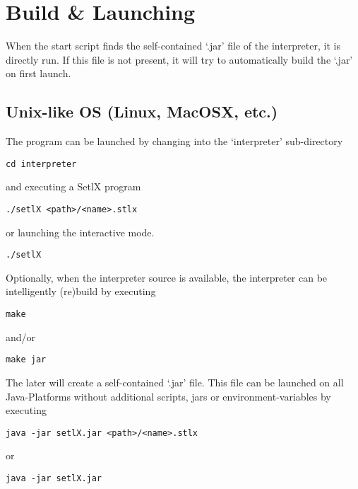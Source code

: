 \section{Build \& Launching}

When the start script finds the self-contained `.jar' file of the interpreter, it is directly run. If this file is not present, it will try to automatically build the `.jar' on first launch.

\subsection{Unix-like OS (Linux, MacOSX, etc.)}

The \setlX{} program can be launched by changing into the `interpreter' sub-directory

\begin{lstlisting}
cd interpreter
\end{lstlisting}

and executing a SetlX program

\begin{lstlisting}
./setlX <path>/<name>.stlx
\end{lstlisting}

or launching the interactive mode.

\begin{lstlisting}
./setlX
\end{lstlisting}

\vspace{1em}

Optionally, when the interpreter source is available, the interpreter can be intelligently (re)build by executing

\begin{lstlisting}
make
\end{lstlisting}

and/or

\begin{lstlisting}
make jar
\end{lstlisting}

The later will create a self-contained `.jar' file. This file can be launched on all Java-Platforms without additional scripts, jars or environment-variables by executing

\begin{lstlisting}
java -jar setlX.jar <path>/<name>.stlx
\end{lstlisting}

or

\begin{lstlisting}
java -jar setlX.jar
\end{lstlisting}

